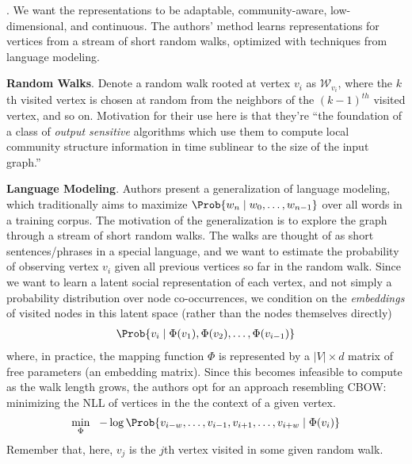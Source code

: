\documentclass[11pt]{article}
\newcommand\myspace[1][]{\vspace{#1\bigskipamount}}
\newcommand\p{\Needspace{10\baselineskip} \noindent}
\begin{document}
\myspace
\p {}. We want the representations to be adaptable, community-aware, low-dimensional, and continuous. The authors' method learns representations for vertices from a stream of short random walks, optimized with techniques from language modeling.
\begin{compactitem}
	\item \textbf{Random Walks}. Denote a random walk rooted at vertex $v_i$ as $\mathcal{W}_{v_i}$, where the $k$th visited vertex is chosen at random from the neighbors of the $(k-1)^{th}$ visited vertex, and so on. Motivation for their use here is that they're ``the foundation of a class of \textit{output sensitive} algorithms which use them to compute local community structure information in time sublinear to the size of the input graph.''
	
	\item \textbf{Language Modeling}. Authors present a generalization of language modeling, which traditionally aims to maximize $\Prob{w_n \mid w_0, \ldots, w_{n-1}}$ over all words in a training corpus. The motivation of the generalization is to explore the graph through a stream of short random walks. The walks are thought of as short sentences/phrases in a special language, and we want to estimate the probability of observing vertex $v_i$ given all previous vertices so far in the random walk. Since we want to learn a latent social representation of each vertex, and not simply a probability distribution over node co-occurrences, we condition on the \textit{embeddings} of visited nodes in this latent space (rather than the nodes themselves directly)
	\begin{align}
		\Prob{v_i \mid \Phi(v_1), \Phi(v_2), \ldots, \Phi(v_{i - 1})} 
	\end{align}
	where, in practice, the mapping function $\Phi$ is represented by a $|V| \times d$ matrix of free parameters (an embedding matrix). Since this becomes infeasible to compute as the walk length grows, the authors opt for an approach resembling CBOW: minimizing the NLL of vertices in the the context of a given vertex.
	\begin{align}
		\min_{\Phi}~~ - \log \Prob{v_{i-w}, \ldots, v_{i-1}, v_{i+1}, \ldots, v_{i+w} \mid \Phi(v_i) }
	\end{align}
	Remember that, here, $v_j$ is the $j$th vertex visited in some given random walk. 
\end{compactitem}
\end{document}
